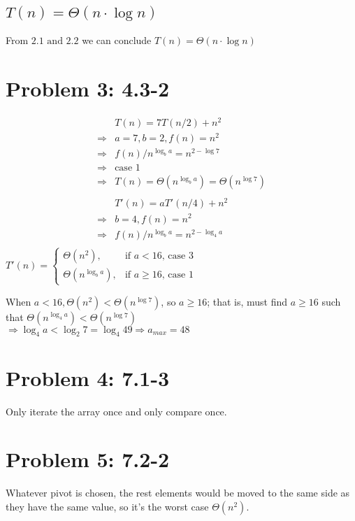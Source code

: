 \documentclass[a4paper]{article}
\begin{document}
\subsection{$T(n)= \Theta(n\cdot \log n)$}
From $2.1 \text{ and } 2.2$ we can conclude {$T(n)= \Theta(n\cdot \log n)$}

\section{Problem 3: 4.3-2} 

\begin{align*}
    & T(n) = 7T (n/2)+n^2 \\
   \Rightarrow &  a=7, b=2, f(n)=n^2 \\
   \Rightarrow &  f(n)/n^{\log_b{a}}=n^{2-\log{7}}\\
   \Rightarrow & \text{case 1} \\
   \Rightarrow & T(n)=\Theta(n^{\log_b{a}})= \Theta(n^{\log{7}})\\\\
    & T'(n) = aT' (n/4)+n^2 \\
   \Rightarrow &  b=4, f(n)=n^2 \\
   \Rightarrow &  f(n)/n^{\log_b{a}}=n^{2-\log_4{a}}\\
\end{align*}
$
T'(n) =
\begin{cases}
\Theta(n^2),  & \text{if $a<16$, case 3 } \\
\Theta(n^{\log_b{a}}), & \text{if $a\geq16$, case 1}
\end{cases}
$


When $a<16, \Theta(n^2)<\Theta(n^{\log{7}})$, so $a\geq16$; that is, must find $a\geq16$ such that $\Theta(n^{\log_4{a}}) < \Theta(n^{\log{7}}) $\\
$
\Rightarrow \log_4{a}<\log_2{7}=\log_4{49}\Rightarrow a_{max}=48
$

\section{Problem 4: 7.1-3} 

Only iterate the array once and only compare once.

\section{Problem 5: 7.2-2} 

Whatever pivot is chosen, the rest elements would be moved to the same side as they have the same value, so it's the worst case $\Theta(n^2)$.
\end{document}
